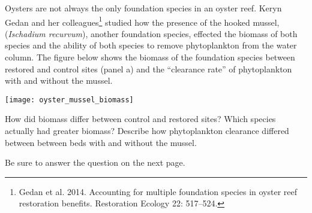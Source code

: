 Oysters are not always the only foundation species in an oyster reef. Keryn Gedan and her colleagues\footnote{Gedan et al. 2014. Accounting for multiple foundation species in oyster reef restoration benefits. Restoration Ecology 22: 517--524.} studied how the presence of the hooked mussel, (\textit{Ischadium recurvum}), another foundation species, effected the biomass of both species and the ability of both species to remove phytoplankton from the water column. The figure below shows the biomass of the foundation species between restored and control sites (panel a) and the ``clearance rate'' of phytoplankton with and without the mussel. 

\texttt{[image: oyster\_mussel\_biomass]}

\question[5]\label{question:project}
How did biomass differ between control and restored sites? Which species actually had greater biomass? Describe how phytoplankton clearance differed between between beds with and without the mussel. 


{\footnotesize Be sure to answer the question on the next page.}

\newpage
